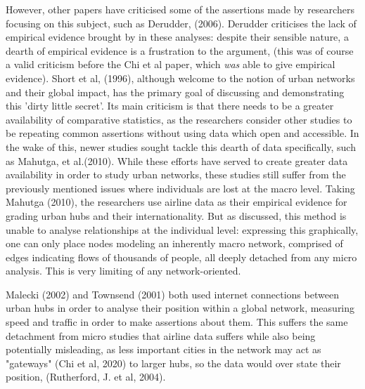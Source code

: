 \documentclass[12pt]{article}
\begin{document}
However, other 
papers have criticised some of the assertions made by researchers focusing on this subject, 
such as Derudder, (2006). Derudder criticises the lack of empirical evidence brought by 
in these analyses: despite their sensible nature, a dearth of empirical evidence is 
a frustration to the argument, (this was of course a valid criticism before the Chi et al 
paper, which \textit{was} able to give empirical evidence). Short et al, (1996), although 
welcome to the notion of urban networks and their global impact, has the primary goal 
of discussing and demonstrating this 'dirty little secret'. Its main criticism is that 
there needs to be a greater availability of comparative statistics, as the researchers 
consider other studies to be repeating common assertions without using data which open 
and accessible. In the wake of this, newer studies sought tackle this dearth of data 
specifically, such as Mahutga, et al.(2010). While these efforts have served to create 
greater data availability in order to study urban networks, these studies still suffer 
from the previously mentioned issues where individuals are lost at the macro level. 
Taking Mahutga (2010), the researchers use airline data as their empirical evidence 
for grading urban hubs and their internationality. But as discussed, this method 
is unable to analyse relationships at the individual level: expressing this graphically,
 one can only place nodes 
modeling an inherently macro network, comprised of edges indicating flows of thousands 
of people, all deeply detached from any micro analysis. This is very limiting of 
any network-oriented.

Malecki (2002) and Townsend (2001) both used internet connections between urban hubs 
in order to analyse their position within a global network, measuring speed and traffic
in order to make assertions about them. This suffers the same detachment from micro 
studies that airline data suffers while also being potentially misleading, as 
less important cities in the network may act as "gateways" (Chi et al, 2020) to
larger hubs, so the data would over state their position, (Rutherford, J. et al, 2004).
\end{document}
